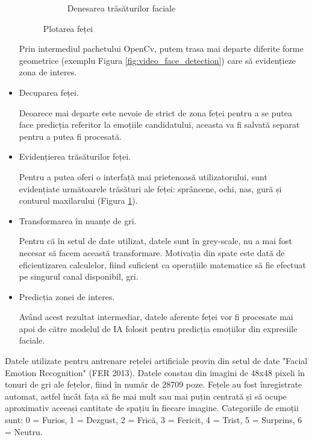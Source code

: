 \documentclass[a4paper, 12pt]{report}
\begin{document}
\begin{itemize}
\begin{figure}[H]
\begin{subfigure}[b]{0.425\textwidth}
				\caption{Denesarea trăsăturilor faciale}
				\label{fig:video_face_features}
			\end{subfigure}
			\caption{Plotarea feței}
			\label{fig:face}
		\end{figure}
	
		Prin intermediul pachetului OpenCv, putem trasa mai departe diferite forme geometrice (exemplu Figura \ref{fig:video_face_detection}) care să evidențieze zona de interes.
		
		\item Decuparea feței.
		
		Deoarece mai departe este nevoie de strict de zona feței pentru a se putea face predicția referitor la emoțiile candidatului, aceasta va fi salvată separat pentru a putea fi procesată. 
		
		\item Evidențierea trăsăturilor feței.
		
		Pentru a putea oferi o interfață mai prietenoasă utilizatorului, sunt evidențiate următoarele trăsături ale feței: sprâncene, ochi, nas, gură și conturul maxilarului (Figura \ref{fig:video_face_features}). 
		
		\item Transformarea în nuanțe de gri.
		
		Pentru că în setul de date utilizat, datele sunt în grey-scale, nu a mai fost necesar să facem această transformare. Motivația din spate este dată de eficientizarea calculelor, fiind suficient ca operațiile matematice să fie efectuat pe singurul canal disponibil, gri.
		
		\item Predicția zonei de interes.
		
		Având acest rezultat intermediar, datele aferente feței vor fi procesate mai apoi de către modelul de IA folosit pentru predicția emoțiilor din expresiile faciale.
		
	\end{itemize}
	
	Datele utilizate pentru antrenare rețelei artificiale provin din setul de date "Facial Emotion Recognition" (FER 2013). Datele constau din imagini de 48x48 pixeli în tonuri de gri ale fețelor, fiind în număr de 28709 poze. Fețele au fost înregistrate automat, astfel încât fața să fie mai mult sau mai puțin centrată și să ocupe aproximativ aceeași cantitate de spațiu în fiecare imagine. Categoriile de emoții sunt: 0 = Furios, 1 = Dezgust, 2 = Frică, 3 = Fericit, 4 = Trist, 5 = Surprins, 6 = Neutru.
	
\end{document}
